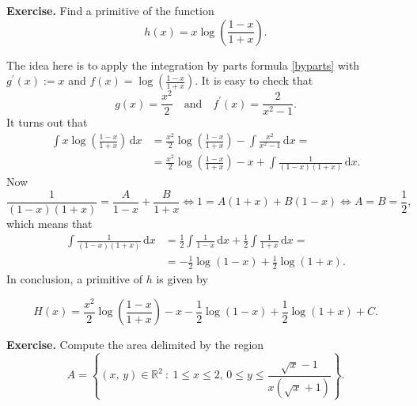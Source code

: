 \documentclass[a4paper,10 pt]{report}
\newcommand{\finalanswer}[1]{%
    \begin{finalAnswer}
    \[
        #1
    \]
    \end{finalAnswer}
}
\theoremstyle{definition}
\newcommand{\R}{\mathbb R}
\begin{document}
\begin{exerciseBox} \textbf{Exercise.} Find a primitive of the function
\begin{equation*} h(x) = x \log \left( \frac{1-x}{1+x} \right). \end{equation*}
\end{exerciseBox}

\begin{solutionBox} The idea here is to apply the integration by parts formula \eqref{byparts} with $g^\prime(x) := x$ and $f(x) = \log \left( \frac{1-x}{1+x} \right)$. It is easy to check that
\begin{equation*} g(x) = \frac{x^2}{2} \quad \text{and} \quad f^\prime(x) = \frac{2}{x^2 - 1}. \end{equation*}
It turns out that
\begin{equation*} \begin{aligned} \int x \log \left( \frac{1-x}{1+x} \right) \, \mathrm{d}x & = \frac{x^2}{2} \log \left( \frac{1-x}{1+x} \right) - \int \frac{x^2}{x^2 - 1} \, \mathrm{d}x =
\\[1em] & = \frac{x^2}{2} \log \left( \frac{1-x}{1+x} \right) - x + \int \frac{1}{(1-x)(1+x)} \, \mathrm{d}x. \end{aligned} \end{equation*}
Now
\begin{equation*}  \frac{1}{(1-x)(1+x)} = \frac{A}{1-x} + \frac{B}{1 + x} \iff 1 = A(1 + x) + B(1 -x) \iff A = B = \frac{1}{2}, \end{equation*}
which means that
\begin{equation*}\begin{aligned} \int \frac{1}{(1-x)(1+x)} \, \mathrm{d}x & = \frac{1}{2} \int \frac{1}{1-x} \, \mathrm{d}x + \frac{1}{2} \int \frac{1}{1+x} \, \mathrm{d}x =
\\[1em] & = - \frac{1}{2} \log(1 - x) + \frac{1}{2} \log(1 + x). \end{aligned} \end{equation*}
In conclusion, a primitive of $h$ is given by
\finalanswer{
 H(x) = \frac{x^2}{2} \log \left( \frac{1-x}{1+x} \right) - x - \frac{1}{2} \log(1 - x) + \frac{1}{2} \log(1 + x) + C. 
}\end{solutionBox}

\begin{exerciseBox} \textbf{Exercise.} Compute the area delimited by the region
\begin{equation*} A = \left\{ (x, \, y) \in \R^2 \: : \: 1 \leq x \leq 2, \, 0 \leq y \leq \frac{\sqrt{x} - 1}{x(\sqrt{x} + 1)} \right\}.\end{equation*}
\end{exerciseBox}
\end{document}
